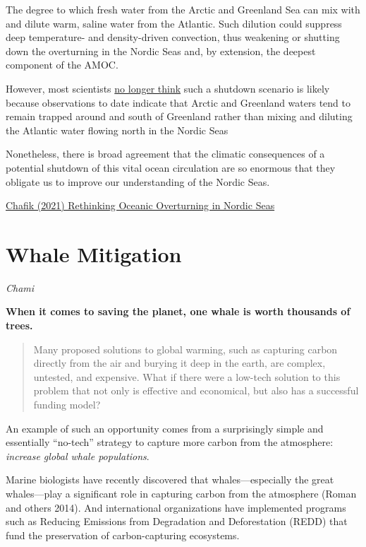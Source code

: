 \documentclass[
]{book}
\begin{document}
The degree to which fresh water from the Arctic and Greenland Sea can mix with and dilute warm, saline water from the Atlantic. Such dilution could suppress deep temperature- and density-driven convection, thus weakening or shutting down the overturning in the Nordic Seas and, by extension, the deepest component of the AMOC.

However, most scientists \href{https://www.carbonbrief.org/guest-post-could-the-atlantic-overturning-circulation-shut-down}{no longer think} such a shutdown scenario is likely because observations to date indicate that Arctic and Greenland waters tend to remain trapped around and south of Greenland rather than mixing and diluting the Atlantic water flowing north in the Nordic Seas

Nonetheless, there is broad agreement that the climatic consequences of a potential shutdown of this vital ocean circulation are so enormous that they obligate us to improve our understanding of the Nordic Seas.

\href{https://eos.org/science-updates/rethinking-oceanic-overturning-in-the-nordic-seas\#.YHvKO1RSYTk.twitter}{Chafik (2021) Rethinking Oceanic Overturning in Nordic Seas}

\hypertarget{whale-mitigation}{%
\section{Whale Mitigation}\label{whale-mitigation}}

\emph{Chami}

\textbf{When it comes to saving the planet, one whale is worth thousands of trees.}

\begin{quote}
Many proposed solutions to global warming, such as capturing carbon directly from the air and burying it deep in the earth, are complex, untested, and expensive. What if there were a low-tech solution to this problem that not only is effective and economical, but also has a successful funding model?
\end{quote}

An example of such an opportunity comes from a surprisingly simple and essentially ``no-tech'' strategy to capture more carbon from the atmosphere: \emph{increase global whale populations}.

Marine biologists have recently discovered that whales---especially the great whales---play a significant role in capturing carbon from the atmosphere (Roman and others 2014). And international organizations have implemented programs such as Reducing Emissions from Degradation and Deforestation (REDD) that fund the preservation of carbon-capturing ecosystems.
\end{document}
